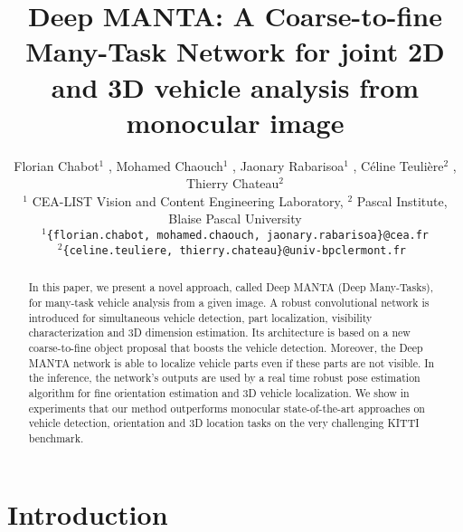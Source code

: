 \documentclass[10pt,twocolumn,letterpaper]{article}
\begin{document}
\title{Deep MANTA: A Coarse-to-fine Many-Task Network for joint 2D and 3D vehicle analysis from monocular image}

\author{Florian Chabot$^{1}$ , Mohamed Chaouch$^{1}$ , Jaonary Rabarisoa$^{1}$ , C\'{e}line Teuli\`{e}re$^{2}$ , Thierry Chateau$^{2}$ \\
$^{1}$ CEA-LIST Vision and Content Engineering Laboratory, $^{2}$ Pascal Institute, Blaise Pascal University\\
{\tt\small $^{1}$\{florian.chabot, mohamed.chaouch, jaonary.rabarisoa\}@cea.fr} \\
{\tt\small $^{2}$\{celine.teuliere, thierry.chateau\}@univ-bpclermont.fr‎ }
}

\maketitle


\maketitle
\begin{abstract}
In this paper, we present a novel approach, called Deep MANTA (Deep Many-Tasks), for many-task vehicle analysis from a given image. A robust convolutional network is introduced for simultaneous vehicle detection, part localization, visibility characterization and 3D dimension estimation. Its architecture is based on a new coarse-to-fine object proposal that boosts the vehicle detection. Moreover, the Deep MANTA network is able to localize vehicle parts even if these parts are not visible. In the inference, the network's outputs are used by a real time robust pose estimation algorithm for fine orientation estimation and 3D vehicle localization. We show in experiments that our method outperforms monocular state-of-the-art approaches on vehicle detection, orientation and 3D location tasks on the very challenging KITTI benchmark.

\end{abstract}

\section{Introduction}
\label{sec:intro}
\thispagestyle{empty}
\end{document}
